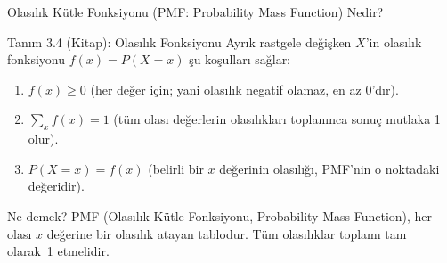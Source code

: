 \documentclass[light]{lutbeamer}
\begin{document}
\begin{frame}{Olasılık Kütle Fonksiyonu (PMF: Probability Mass Function) Nedir?}
\begin{block}{Tanım 3.4 (Kitap): Olasılık Fonksiyonu}
  Ayrık rastgele değişken $X$'in olasılık fonksiyonu $f(x) = P(X = x)$ şu koşulları sağlar:
  \begin{enumerate}
    \item $f(x) \ge 0$ \quad (her değer için; yani olasılık negatif olamaz, en az 0'dır).
    \item $\displaystyle\sum_{x} f(x) = 1$ \quad (tüm olası değerlerin olasılıkları toplanınca sonuç mutlaka 1 olur).
    \item $P(X = x) = f(x)$ \quad (belirli bir $x$ değerinin olasılığı, PMF'nin o noktadaki değeridir).
  \end{enumerate}
\end{block}

\begin{exampleblock}{Ne demek?}
  PMF (Olasılık Kütle Fonksiyonu, Probability Mass Function), her olası $x$ değerine bir olasılık atayan tablodur.
  Tüm olasılıklar toplamı tam olarak~1 etmelidir.
\end{exampleblock}
\end{frame}
\end{document}
